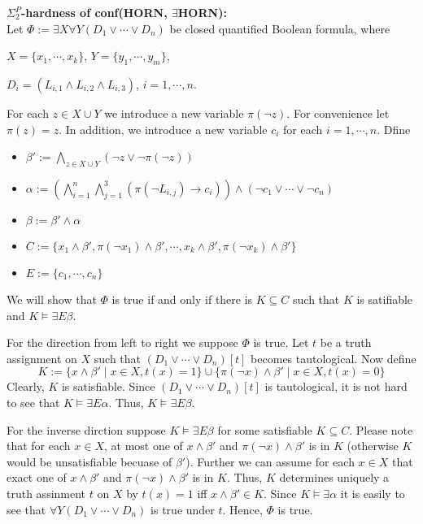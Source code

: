 \documentclass[12pt]{article}
\begin{document}
{\bf $\Sigma^P_2$-hardness of conf(HORN, $\exists$HORN):}\\

Let $\Phi:=\exists X\forall Y (D_1\vee\cdots\vee D_n)$ be closed quantified Boolean formula, where 

$X=\{x_1,\cdots, x_k\}$, $Y=\{y_1,\cdots, y_m\}$, 

$D_i=(L_{i,1}\wedge L_{i,2}\wedge L_{i,3})$, $i=1,\cdots, n$.

\noindent For each $z\in X\cup Y$ we introduce a new variable $\pi(\neg z)$. For convenience let $\pi(z)=z$. In addition, we introduce a new variable $c_i$ for each $i=1,\cdots, n$. Dfine

\begin{itemize}
\item $\beta':=\bigwedge_{z\in X\cup Y} (\neg z\vee \neg \pi(\neg z))$

\item $\alpha:=\left(\bigwedge_{i=1}^{n}\bigwedge_{j=1}^{3}(\pi(\neg L_{i,j})\rightarrow c_i)\right)\wedge(\neg c_1\vee\cdots\vee \neg c_n)$

\item $\beta:=\beta'\wedge\alpha$

\item $C:=\{x_1\wedge \beta', \pi(\neg x_1)\wedge\beta', \cdots, 
x_k\wedge \beta', \pi(\neg x_k)\wedge\beta'\}$

\item $E:=\{c_1,\cdots, c_n\}$
\end{itemize}
We will show that $\Phi$ is true if and only if there is $K\subseteq C$ such that $K$ is satifiable and $K\models\exists E\beta$.

For the direction from left to right we suppose $\Phi$ is true. Let $t$ be a truth assignment on $X$ such that $(D_1\vee\cdots\vee D_n)[t]$ becomes tautological. Now define
$$K:=\{x\wedge \beta'\mid x\in X, t(x)=1\}\cup\{\pi(\neg x)\wedge\beta'\mid x\in X, t(x)=0\}$$
Clearly, $K$ is satisfiable. Since $(D_1\vee\cdots\vee D_n)[t]$ is tautological, it is not hard to see that $K\models\exists E\alpha$. Thus, $K\models\exists E\beta$. 

For the inverse dirction suppose $K\models \exists E\beta$ for some satisfiable $K\subseteq C$. Please note that for each $x\in X$, at most one of $x\wedge \beta'$ and $\pi(\neg x)\wedge\beta'$ is in $K$ (otherwise $K$ would be unsatisfiable becuase of $\beta'$). 
Further we can assume for each $x\in X$ that exact one of $x\wedge \beta'$ and $\pi(\neg x)\wedge\beta'$ is in $K$. Thus, $K$ determines uniquely a truth assinment $t$ on $X$ by $t(x)=1$ iff $x\wedge \beta'\in K$. Since $K\models\exists \alpha$ it is easily to see that $\forall Y(D_1\vee\cdots\vee D_n)$ is true under $t$. Hence, $\Phi$ is true. \\
\end{document}
